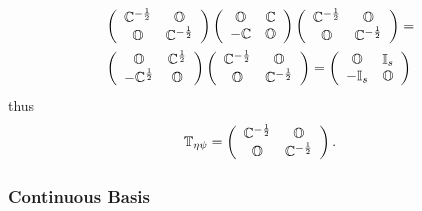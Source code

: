\documentclass[aps,preprint]{revtex4}%
\begin{document}
\begin{align}
&  \left(
\begin{array}
[c]{cc}%
\mathbb{C}^{-\frac{1}{2}} & \mathbb{O}\\
\mathbb{O} & \mathbb{C}^{-\frac{1}{2}}%
\end{array}
\right)  \left(
\begin{array}
[c]{cc}%
\mathbb{O} & \mathbb{C}\\
-\mathbb{C} & \mathbb{O}%
\end{array}
\right)  \left(
\begin{array}
[c]{cc}%
\mathbb{C}^{-\frac{1}{2}} & \mathbb{O}\\
\mathbb{O} & \mathbb{C}^{-\frac{1}{2}}%
\end{array}
\right)  =\\
&  \left(
\begin{array}
[c]{cc}%
\mathbb{O} & \mathbb{C}^{\frac{1}{2}}\\
-\mathbb{C}^{\frac{1}{2}} & \mathbb{O}%
\end{array}
\right)  \left(
\begin{array}
[c]{cc}%
\mathbb{C}^{-\frac{1}{2}} & \mathbb{O}\\
\mathbb{O} & \mathbb{C}^{-\frac{1}{2}}%
\end{array}
\right)  =\left(
\begin{array}
[c]{cc}%
\mathbb{O} & \mathbb{I}_{s}\\
-\mathbb{I}_{s} & \mathbb{O}%
\end{array}
\right)
\end{align}
thus%
\begin{equation}
\mathbb{T}_{\eta\psi}=\left(
\begin{array}
[c]{cc}%
\mathbb{C}^{-\frac{1}{2}} & \mathbb{O}\\
\mathbb{O} & \mathbb{C}^{-\frac{1}{2}}%
\end{array}
\right)  .
\end{equation}


\subsubsection{Continuous Basis}
\end{document}
